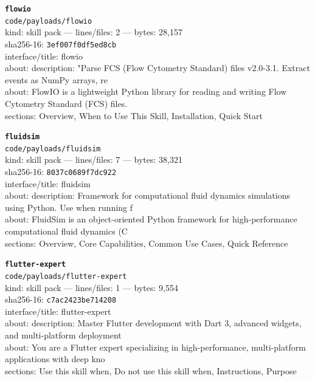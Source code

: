 \noindent\textbf{\texttt{flowio}}\\
\texttt{code/payloads/flowio}\\
kind: skill pack --- lines/files: 2 --- bytes: 28,157\\
sha256-16: \texttt{3ef007f0df5ed8cb}\\
interface/title: flowio\\
about: description: "Parse FCS (Flow Cytometry Standard) files v2.0-3.1. Extract events as NumPy arrays, re\\
about: FlowIO is a lightweight Python library for reading and writing Flow Cytometry Standard (FCS) files. \\
sections: Overview, When to Use This Skill, Installation, Quick Start\\
\vspace*{6.0pt}

\noindent\textbf{\texttt{fluidsim}}\\
\texttt{code/payloads/fluidsim}\\
kind: skill pack --- lines/files: 7 --- bytes: 38,321\\
sha256-16: \texttt{8037c0689f7dc922}\\
interface/title: fluidsim\\
about: description: Framework for computational fluid dynamics simulations using Python. Use when running f\\
about: FluidSim is an object-oriented Python framework for high-performance computational fluid dynamics (C\\
sections: Overview, Core Capabilities, Common Use Cases, Quick Reference\\
\vspace*{6.0pt}

\noindent\textbf{\texttt{flutter-expert}}\\
\texttt{code/payloads/flutter-expert}\\
kind: skill pack --- lines/files: 1 --- bytes: 9,554\\
sha256-16: \texttt{c7ac2423be714208}\\
interface/title: flutter-expert\\
about: description: Master Flutter development with Dart 3, advanced widgets, and multi-platform deployment\\
about: You are a Flutter expert specializing in high-performance, multi-platform applications with deep kno\\
sections: Use this skill when, Do not use this skill when, Instructions, Purpose\\
\vspace*{6.0pt}
\newpage

